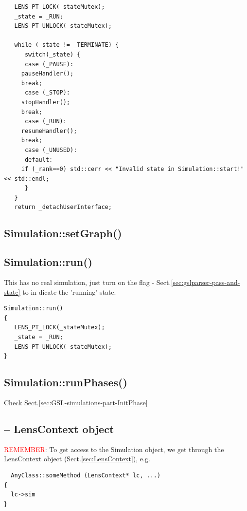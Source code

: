 \begin{enumerate}
\begin{verbatim}
   LENS_PT_LOCK(_stateMutex);
   _state = _RUN;
   LENS_PT_UNLOCK(_stateMutex);

   while (_state != _TERMINATE) {
      switch(_state) {
      case (_PAUSE):
	 pauseHandler();
	 break;
      case (_STOP):
	 stopHandler();
	 break;
      case (_RUN):
	 resumeHandler();
	 break;
      case (_UNUSED):
      default: 
	 if (_rank==0) std::cerr << "Invalid state in Simulation::start!" << std::endl;
      }
   }
   return _detachUserInterface;
\end{verbatim}

\end{enumerate}


\subsection{Simulation::setGraph()}
\label{sec:Simulation.setGraph()}




\subsection{Simulation::run()}
\label{sec:Simulation.run()}

This has no real simulation, just turn on the flag -
Sect.\ref{sec:gslparser-pass-and-state} to in dicate the 'running' state.

\begin{verbatim}
Simulation::run()
{
   LENS_PT_LOCK(_stateMutex);
   _state = _RUN;
   LENS_PT_UNLOCK(_stateMutex);
}
\end{verbatim}



\subsection{Simulation::runPhases()}
\label{sec:Simulation::runPhases()}

Check Sect.\ref{sec:GSL-simulations-part-InitPhase}


\subsection{-- LensContext object}

\textcolor{red}{REMEMBER}: To get access to the Simulation object, we get
through the LensContext object (Sect.\ref{sec:LensContext}), e.g. 
\begin{verbatim}
  AnyClass::someMethod (LensContext* lc, ...)
{
  lc->sim
}
\end{verbatim}

